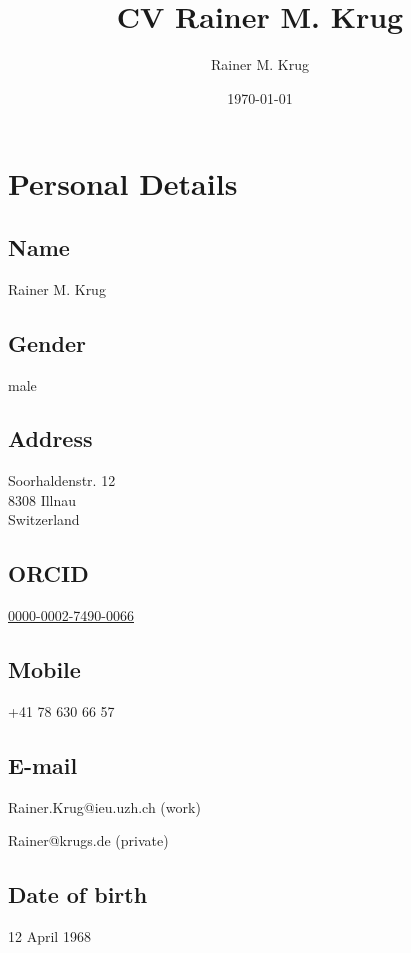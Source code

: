 \documentclass[a4paper]{article}
\author{Rainer M. Krug}
\date{\today}
\title{CV Rainer M. Krug}
\begin{document}
\maketitle


\section{Personal Details}

\subsection{Name}

Rainer M. Krug

\subsection{Gender}

male

\subsection{Address}

Soorhaldenstr. 12 \\
8308 Illnau \\
Switzerland

\subsection{ORCID}

\href{https://orcid.org/0000-0002-7490-0066}{0000-0002-7490-0066}

\subsection{Mobile}

+41 78 630 66 57

\subsection{E-mail}

Rainer.Krug@ieu.uzh.ch (work)

Rainer@krugs.de (private)

\subsection{Date of birth}

12 April 1968
\end{document}
